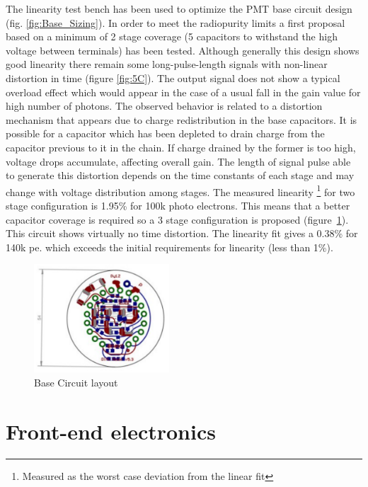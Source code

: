 \documentclass[a4paper, 10pt, oneside, twocolumn, 3p]{elsarticle}
\begin{document}
\par The linearity test bench has been used to optimize the PMT base circuit design (fig. \ref{fig:Base_Sizing}). In order to meet the radiopurity limits \cite{1029-8479} a first proposal based on a minimum of 2 stage coverage (5 capacitors to withstand the high voltage between terminals) has been tested. Although generally this design shows good linearity there remain some long-pulse-length signals with non-linear distortion in time  (figure \ref{fig:5C}). The output signal does not show a typical overload effect which would appear in the case of a usual fall in the gain value for high number of photons. The observed behavior is related to a distortion mechanism that appears due to charge redistribution in the base capacitors. It is possible for a capacitor which has been depleted to drain charge from the capacitor previous to it in the chain. If charge drained by the former is too high, voltage drops accumulate, affecting overall gain. The length of signal pulse able to generate this distortion depends on the time constants of each stage and may change with voltage distribution among stages. The measured linearity  \footnote{Measured as the worst case deviation from the linear fit} for two stage configuration is 1.95\% for 100k photo electrons. This means that a better capacitor coverage is required so a 3 stage configuration is proposed (figure~\ref{fig:7C_layout}). This circuit shows virtually no time distortion. The linearity fit gives a 0.38\% for 140k pe. which exceeds the initial requirements for linearity (less than 1\%).

\begin{figure}
  \begin{center}
    \includegraphics[width=0.45\textwidth]{./figures/7C_layout.pdf}
    \caption{Base Circuit layout}
    \label{fig:7C_layout}
  \end{center}
\end{figure}

\section{Front-end electronics}
\end{document}
